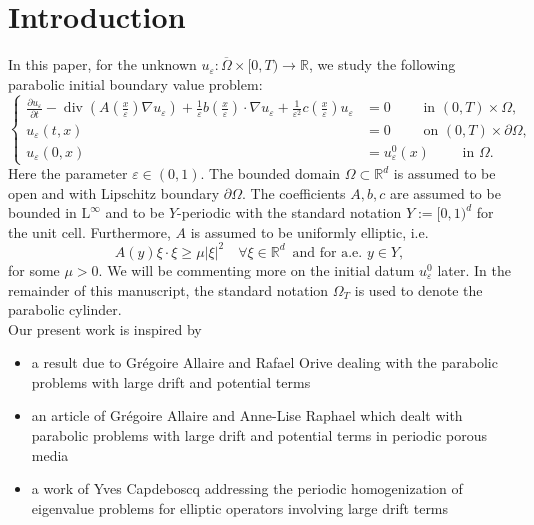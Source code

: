 \documentclass[preprint, 12pt]{amsart}
\numberwithin{equation}{section}
\numberwithin{equation}{section}
\newcommand\RR{\mathbb{R}}
\newcommand{\eps}{\varepsilon}
\DeclareMathOperator{\dv}{div}
\begin{document}


\section{Introduction}
In this paper, for the unknown $u_\eps:\overline{\Omega}\times[0,T)\to\RR$, we study the following parabolic initial boundary value problem:
\begin{equation}\label{eq:main}
\left\{
\begin{aligned}
\frac{\partial u_{\eps}}{\partial t} - \dv\left(A\left(\frac{x}{\eps}\right) \nabla u_{\eps}\right) + \frac{1}{\eps}b\left(\frac{x}{\eps}\right) \cdot \nabla u_{\eps} + \frac{1}{\eps^2}c\left(\frac{x}{\eps}\right)u_{\eps} & = 0 \qquad \mbox{ in }(0,T) \times \Omega,\\
u_{\eps}(t,x) & = 0 \qquad \mbox{ on } (0,T)\times \partial \Omega,\\
u_{\eps}(0,x) & = u_{\eps}^0(x)\qquad \mbox{ in } \Omega.
 \end{aligned}
\right.
\end{equation}
Here the parameter $\eps\in(0,1)$. The bounded domain $\Omega\subset\RR^d$ is assumed to be open and with Lipschitz boundary $\partial\Omega$. The coefficients $A,b,c$ are assumed to be bounded in $\mathrm L^\infty$ and to be $Y$-periodic with the standard notation $Y:=[0,1)^d$ for the unit cell. Furthermore, $A$ is assumed to be uniformly elliptic, i.e.
\[
A(y)\xi\cdot\xi \ge \mu \left\vert \xi\right\vert^2 \quad \forall \xi\in\RR^d \, \mbox{ and for a.e. }y\in Y,
\]
for some $\mu>0$. We will be commenting more on the initial datum $u^0_\eps$ later. In the remainder of this manuscript, the standard notation $\Omega_T$ is used to denote the parabolic cylinder.\\
Our present work is inspired by 
\begin{itemize}
\item a result due to Gr\'egoire Allaire and Rafael Orive \cite{allaire2007homogenization} dealing with the parabolic problems with large drift and potential terms
\item an article of Gr\'egoire Allaire and Anne-Lise Raphael \cite{allaireraphael2007homogenization} which dealt with parabolic problems with large drift and potential terms in periodic porous media
\item a work of Yves Capdeboscq \cite{capdeboscq1998homogenization} addressing the periodic homogenization of eigenvalue problems for elliptic operators involving large drift terms
\end{itemize}
\end{document}
